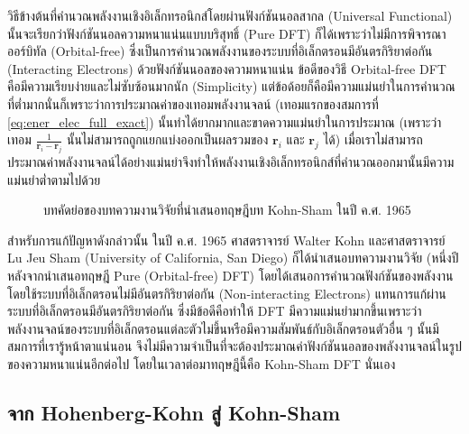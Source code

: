 วิธีข้างต้นที่คำนวณพลังงานเชิงอิเล็กทรอนิกส์โดยผ่านฟังก์ชันนอลสากล (Universal Functional) นั้นจะเรียกว่าฟังก์ชันนอลความหนาแน่นแบบบริสุทธิ์ (Pure DFT) ก็ได้เพราะว่าไม่มีการพิจารณาออร์บิทัล (Orbital-free) ซึ่งเป็นการคำนวณพลังงานของระบบที่อิเล็กตรอนมีอันตรกิริยาต่อกัน (Interacting Electrons) ด้วยฟังก์ชันนอลของความหนาแน่น\autocite{ligneres2005} ข้อดีของวิธี Orbital-free DFT คือมีความเรียบง่ายและไม่ซับซ้อนมากนัก (Simplicity) แต่ข้อด้อยก็คือมีความแม่นยำในการคำนวณที่ต่ำมากนั่นก็เพราะว่าการประมาณค่าของเทอมพลังงานจลน์ (เทอมแรกของสมการที่ \eqref{eq:ener_elec_full_exact}) นั้นทำได้ยากมากและขาดความแม่นยำในการประมาณ (เพราะว่าเทอม $\frac{1}{\bm{r}_{i} - \bm{r}_{j}}$ นั้นไม่สามารถถูกแยกแบ่งออกเป็นผลรวมของ $\bm{r}_{i}$ และ $\bm{r}_{j}$ ได้) เมื่อเราไม่สามารถประมาณค่าพลังงานจลน์ได้อย่างแม่นยำจึงทำให้พลังงานเชิงอิเล็กทรอนิกส์ที่คำนวณออกมานั้นมีความแม่นยำต่ำตามไปด้วย

\begin{figure}[H]
    \centering
    \caption{บทคัดย่อของบทความงานวิจัยที่นำเสนอทฤษฎีบท Kohn-Sham ในปี ค.ศ. 1965}
    \label{fig:kohn_sham_abs}
\end{figure}

สำหรับการแก้ปัญหาดังกล่าวนั้น ในปี ค.ศ. 1965 ศาสตราจารย์ Walter Kohn และศาสตราจารย์ Lu Jeu Sham (University of California, San Diego) ก็ได้นำเสนอบทความงานวิจัย (หนึ่งปีหลังจากนำเสนอทฤษฎี Pure (Orbital-free) DFT) โดยได้เสนอการคำนวณฟังก์ชันของพลังงานโดยใช้ระบบที่อิเล็กตรอนไม่มีอันตรกิริยาต่อกัน (Non-interacting Electrons) แทนการแก้ผ่านระบบที่อิเล็กตรอนมีอันตรกิริยาต่อกัน\autocite{kohn1965} ซึ่งมีข้อดีคือทำให้ DFT มีความแม่นยำมากขึ้นเพราะว่าพลังงานจลน์ของระบบที่อิเล็กตรอนแต่ละตัวไม่ขึ้นหรือมีความสัมพันธ์กับอิเล็กตรอนตัวอื่น ๆ นั้นมีสมการที่เรารู้หน้าตาแน่นอน จึงไม่มีความจำเป็นที่จะต้องประมาณค่าฟังก์ชันนอลของพลังงานจลน์ในรูปของความหนาแน่นอีกต่อไป โดยในเวลาต่อมาทฤษฎีนี้คือ Kohn-Sham DFT นั่นเอง

\subsection{จาก Hohenberg-Kohn สู่ Kohn-Sham}
\label{ssec:from_hk_to_ks}

